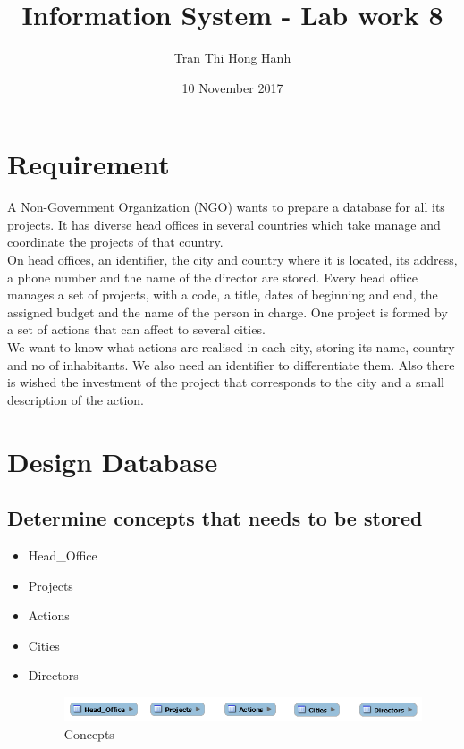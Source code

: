 \documentclass{article}
\title{Information System - Lab work 8}
\author{Tran Thi Hong Hanh}
\date{10 November 2017}
\begin{document}
\maketitle
\section{Requirement}
A Non-Government Organization (NGO) wants to prepare a database for all its
projects. It has diverse head offices in several countries which take manage and coordinate the projects of that country.\\
On head offices, an identifier, the city and country where it is located, its address, a phone number and the name of the director are stored. Every head office manages a set of projects, with a code, a title, dates of beginning and end, the assigned budget and the name of the person in charge. One project is formed by a set of actions that can affect to several cities.\\
We want to know what actions are realised in each city, storing its name, country and no of inhabitants. We also need an identifier to differentiate them. Also there is wished the investment of the project that corresponds to the city and a small description of the action.

\section{Design Database}
\subsection{Determine concepts that needs to be stored}
\begin{itemize}
	\item Head\_Office
	\item Projects
	\item Actions
	\item Cities
	\item Directors
\begin{figure}[h]
\centering
\includegraphics[scale = 0.5]{1.PNG}
\caption{Concepts}
\end{figure}
\end{itemize}
\end{document}
